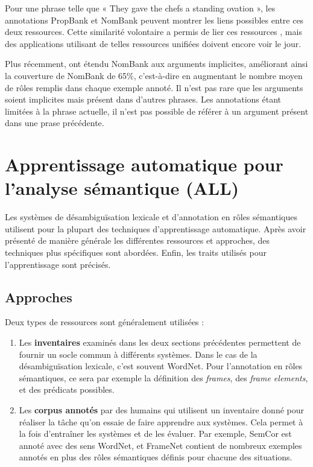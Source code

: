 Pour une phrase telle que « They gave the chefs a standing ovation », les
annotations PropBank et NomBank peuvent montrer les liens possibles entre ces
deux ressources. Cette similarité volontaire a permis de lier ces ressources
\citep{pustejovsky2005merging,verhagen2007combining}, mais des applications
utilisant de telles ressources unifiées doivent encore voir le jour.

Plus récemment, \cite{gerber2010beyond} ont étendu NomBank aux arguments
implicites, améliorant ainsi la couverture de NomBank de 65\%, c'est-à-dire en
augmentant le nombre moyen de rôles remplis dans chaque exemple annoté. Il
n'est pas rare que les arguments soient implicites mais présent dans d'autres
phrases. Les annotations étant limitées à la phrase actuelle, il n'est pas
possible de référer à un argument présent dans une prase précédente.

\section{Apprentissage automatique pour l'analyse sémantique (ALL)}

Les systèmes de désambiguïsation lexicale et d'annotation en rôles sémantiques
utilisent pour la plupart des techniques d'apprentissage automatique. Après
avoir présenté de manière générale les différentes ressources et approches, des
techniques plus spécifiques sont abordées. Enfin, les traits utilisés pour
l'apprentissage sont précisés.

\subsection{Approches}

Deux types de ressources sont généralement utilisées :

\begin{enumerate}

    \item Les \textbf{inventaires} examinés dans les deux sections précédentes
        permettent de fournir un socle commun à différents systèmes. Dans le
        cas de la désambiguïsation lexicale, c'est souvent WordNet. Pour
        l'annotation en rôles sémantiques, ce sera par exemple la définition
        des \textit{frames}, des \textit{frame elements}, et des prédicats
        possibles.

    \item Les \textbf{corpus annotés} par des humains qui utilisent un
        inventaire donné pour réaliser la tâche qu'on essaie de faire apprendre
        aux systèmes. Cela permet à la fois d'entraîner les systèmes et de les
        évaluer. Par exemple, SemCor est annoté avec des sens WordNet, et
        FrameNet contient de nombreux exemples annotés en plus des rôles
        sémantiques définis pour chacune des situations.

\end{enumerate}

